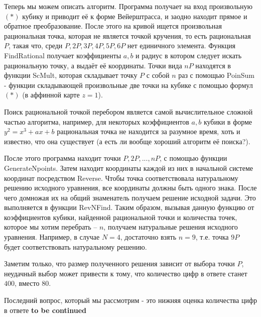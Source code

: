 Теперь мы можем описать алгоритм. Программа получает на вход произвольную
\((*)\) кубику и приводит её к форме Вейерштрасса, и заодно находит прямое и
обратное преобразование. После этого на кривой ищется произвольная
рациональная точка, которая не является точкой кручения, то есть  рациональная
\(P\), такая что, среди \(P, 2P, 3P, 4P, 5P, 6P\) нет единичного элемента.
Функция \textsf{FindRational} получает коэффициенты \(a, b\) и радиус в
котором следует искать рациональную точку,  а выдаёт её координаты. Точки вида
\(nP\) находятся в функции \textsf{ScMult}, которая складывает точку \(P\) с
собой \(n\) раз с помощью \textsf{PoinSum} - функции складывающей произвольные
две точки на кубике с помощью формул  \((*)\) (в аффинной карте \(z = 1\)). 

\begin{remark*}
    Поиск рациональной точкой перебором является самой вычислительное
    сложной частью алгоритма, например, для некоторых коэффициентов \(a, b\) кубики в
    форме \(y^2 = x^3 + ax + b\) рациональная точка не находится за разумное
    время, хоть и известно, что она существует (а есть ли вообще хороший алгоритм 
    её поиска?). 
\end{remark*}

После этого программа находит точки \(P, 2P, ... , nP\), с помощью функции
\textsf{GenerateNpoints}. Затем находит координаты каждой из них в начальной системе
координат посредством Reverse. Чтобы точка соответствовала натуральному
решению исходного уравнения, все координаты должны быть одного знака. После
чего домножая их на общий знаменатель получаем решение исходной задачи. Это
выполняется в функции \textsf{RevNFind}. Таким образом, вызывая данную функцию от
коэффициентов кубики, найденной рациональной точки и  количества точек,
которое мы хотим перебрать -- \(n\), получаем натуральные решения исходного
уравнения. Например, в случае \(N = 4\), достаточно взять \(n = 9\), т.е.
точка \(9P\) будет соответствовать натуральному решению.
 
Заметим только, что размер полученного решения зависит от выбора точки \(P\),
неудачный выбор может привести к тому, что количество цифр в ответе станет
\(400\), вместо \(80\).

Последний вопрос, который мы рассмотрим - это нижняя оценка количества цифр в
ответе \textbf{to be continued}


